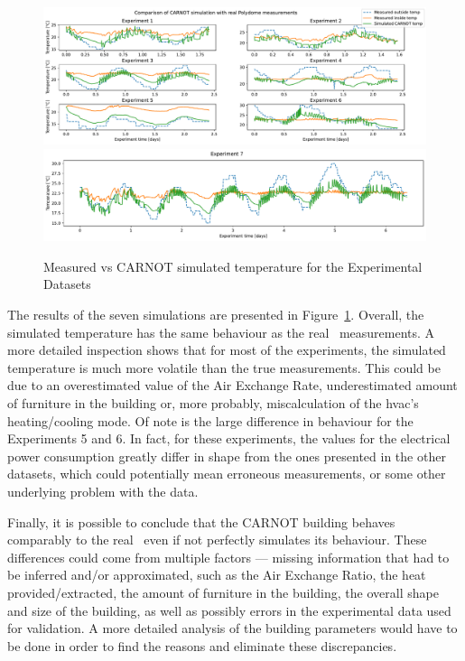 \begin{figure}[ht]
    \centering
    \includegraphics[width = \textwidth]{Plots/CARNOT_comparison_1.pdf}
    \includegraphics[width = \textwidth]{Plots/CARNOT_comparison_2.pdf}
    \caption{Measured vs CARNOT simulated temperature for the Experimental
    Datasets}
    \label{fig:CARNOT_simulation_validation}
\end{figure}

The results of the seven simulations are presented in
Figure~\ref{fig:CARNOT_simulation_validation}. Overall, the simulated
temperature has the same behaviour as the real \pdome\ measurements. A more
detailed inspection shows that for most of the experiments, the simulated
temperature is much more volatile than the true measurements. This could be due
to an overestimated value of the Air Exchange Rate, underestimated amount of
furniture in the building or, more probably, miscalculation of the
\acrshort{hvac}'s heating/cooling mode. Of note is the large difference in
behaviour for the Experiments 5 and 6. In fact, for these experiments, the
values for the electrical power consumption greatly differ in shape from the
ones presented in the other datasets, which could potentially mean erroneous
measurements, or some other underlying problem with the data.

Finally, it is possible to conclude that the CARNOT building behaves comparably
to the real \pdome\, even if not perfectly simulates its behaviour. These
differences  could come from multiple factors --- missing information that had
to be inferred and/or approximated, such as the Air Exchange Ratio, the heat
provided/extracted, the amount of furniture in the building, the overall shape
and size of the building, as well as possibly errors in the experimental data
used for validation. A more detailed analysis of the building parameters would
have to be done in order to find the reasons and eliminate these discrepancies.

\clearpage
